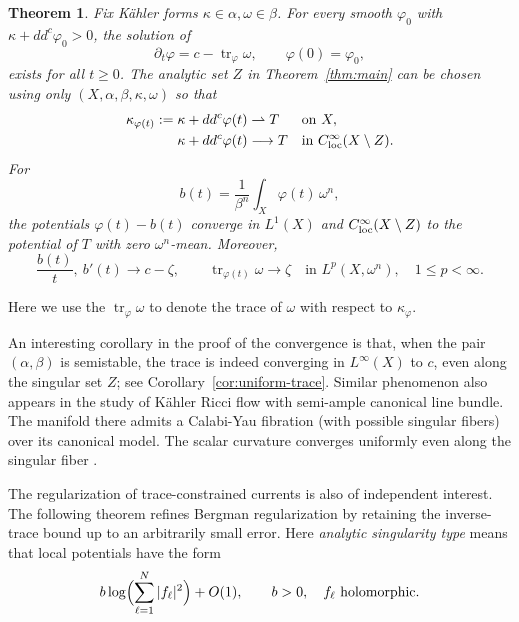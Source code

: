 \documentclass[reqno]{amsart}
\numberwithin{equation}{section}
\newtheorem{theorem}{Theorem}[section]
\theoremstyle{definition}
\DeclareMathOperator{\tr}{tr}
\newcommand{\ddc}{dd^c}
\begin{document}
\begin{theorem}\label{thm:flow}Fix K\"ahler forms $\kappa\in \alpha, \omega\in \beta$. 
For every smooth $\varphi_0$ with $\kappa+\ddc\varphi_0>0$, the solution of
\begin{equation}\label{eq:flow}
 \partial_t\varphi=c-\tr_{\varphi}\omega,\qquad \varphi(0)=\varphi_0,
\end{equation}
exists for all $t\ge0$. The analytic set $Z$ in
Theorem~\ref{thm:main} can be chosen using only
$(X,\alpha,\beta,\kappa,\omega)$ so that
\begin{equation}\label{eq:flow-convergence}
 \begin{aligned}
\kappa_{\varphi(t)}:= \kappa+\ddc\varphi(t)&\rightharpoonup T
       &&\text{on }X,\\
 \kappa+\ddc\varphi(t)&\longrightarrow T
       &&\text{in }C^\infty_{\rm loc}(X\setminus Z).
 \end{aligned}
\end{equation}
For
\[
 b(t)=\frac1{\beta^n}\int_X\varphi(t)\,\omega^n,
\]
the potentials $\varphi(t)-b(t)$ converge in $L^1(X)$ and
$C^\infty_{\rm loc}(X\setminus Z)$ to the potential of $T$ with
zero $\omega^n$-mean. Moreover,
\[
 \frac{b(t)}t,\ b'(t)\longrightarrow c-\zeta,\qquad
 \tr_{\varphi(t)}\omega\longrightarrow\zeta
       \quad\text{in }L^p(X,\omega^n),\quad 1\le p<\infty.
\]

\end{theorem}
Here we use the $\tr_\varphi\omega$ to denote the trace of $\omega$ with respect to $\kappa_\varphi$. 

An interesting corollary in the proof of the convergence is that, when the pair $(\alpha,\beta)$ is semistable, the trace is indeed converging in $L^\infty(X)$ to $c$, even along the singular set $Z$; see Corollary~\ref{cor:uniform-trace}. Similar phenomenon also appears in the study of K\"ahler Ricci flow with semi-ample canonical line bundle. The manifold there admits a Calabi-Yau fibration (with possible singular fibers) over its canonical model. The scalar curvature converges uniformly even along the singular fiber \cite{J20,ZZ26}. 


The regularization of trace-constrained currents is also of
independent interest. The following theorem refines Bergman
regularization \cite{D92,D12} by retaining the inverse-trace
bound up to an arbitrarily small error. Here
\emph{analytic singularity type} means that local potentials
have the form
\[
 b\log\Bigl(\sum_{\ell=1}^N|f_\ell|^2\Bigr)+O(1),
 \qquad b>0,\quad f_\ell\text{ holomorphic}.
\]
\end{document}
